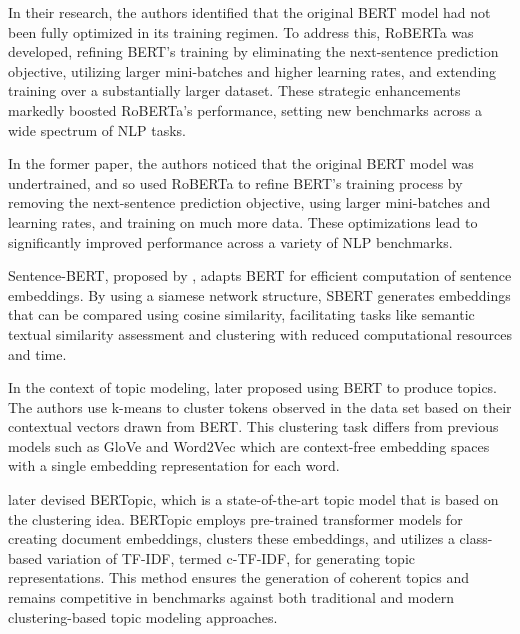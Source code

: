 \documentclass{article}
\begin{document}
In their research, the authors identified that the original BERT model had not been fully optimized in its training regimen. To address this, RoBERTa was developed, refining BERT’s training by eliminating the next-sentence prediction objective, utilizing larger mini-batches and higher learning rates, and extending training over a substantially larger dataset. These strategic enhancements markedly boosted RoBERTa’s performance, setting new benchmarks across a wide spectrum of NLP tasks.

In the former paper, the authors noticed that the original BERT model was undertrained, and so used RoBERTa to refine BERT's training process by removing the next-sentence prediction objective, using larger mini-batches and learning rates, and training on much more data. These optimizations lead to significantly improved performance across a variety of NLP benchmarks.

Sentence-BERT, proposed by \citet{reimers_sentence-bert_2019}, adapts BERT for efficient computation of sentence embeddings. By using a siamese network structure, SBERT generates embeddings that can be compared using cosine similarity, facilitating tasks like semantic textual similarity assessment and clustering with reduced computational resources and time.

In the context of topic modeling, \citet{thompson_topic_2020} later proposed using BERT \cite{devlin_bert_2019} to produce topics. The authors use k-means to cluster tokens observed in the data set based on their contextual vectors drawn from BERT. This clustering task differs from previous models such as GloVe \cite{pennington_glove_2014} and Word2Vec which are context-free embedding spaces with a single embedding representation for each word.


\citet{grootendorst_bertopic_2022} later devised BERTopic, which is a state-of-the-art topic model that is based on the clustering idea. BERTopic employs pre-trained transformer models for creating document embeddings, clusters these embeddings, and utilizes a class-based variation of TF-IDF, termed c-TF-IDF, for generating topic representations. This method ensures the generation of coherent topics and remains competitive in benchmarks against both traditional and modern clustering-based topic modeling approaches.




\end{document}
